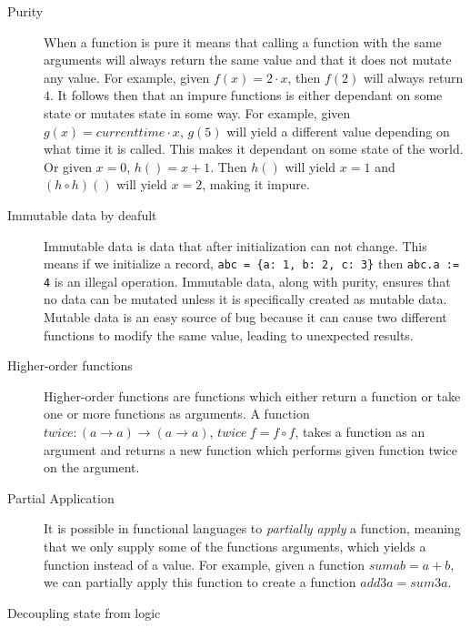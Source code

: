 \begin{description}
\item[ Purity ]

When a function is pure it means that calling a function with the same arguments
        will always return the same value and that it does not mutate any value.
        For example, given $f(x) = 2\cdot x$, then $f(2)$ will always
        return $4$. It follows then that an impure functions is either dependant
        on some state or mutates state in some way. For example, given $g(x) =
        currenttime \cdot x$, $g(5)$ will yield a different value depending on
        what time it is called. This makes it dependant on some state of the
        world. Or given $x=0$, $h()=x+1$. Then $h()$ will yield $x=1$ and $(h
        \circ h)()$ will yield $x=2$, making it impure.~\cite{wikipedia_pure}

\item[ Immutable data by deafult ]

Immutable data is data that after initialization can not change. This means if
we initialize a record, \texttt{abc = \{a: 1, b: 2, c: 3\}} then \texttt{abc.a
:= 4} is an illegal operation. Immutable data, along with purity, ensures that
no data can be mutated unless it is specifically created as mutable data.
Mutable data is an easy source of bug because it can cause two different
functions to modify the same value, leading to unexpected results.

\item[Higher-order functions]

	Higher-order functions are functions which either return a function or take
one or more functions as arguments. A function $twice : (a\rightarrow
a)\rightarrow (a\rightarrow a)$, $twice\ f = f \circ f$, takes a function as an
argument and returns a new function which performs given function twice on the
argument. 

\item[Partial Application] 
    It is possible in functional languages to \textit{partially apply} a
    function, meaning that we only supply some of the functions arguments, which
    yields a function instead of a value. For example, given a function $sum a b
    = a + b$, we can partially apply this function to create a function $add3 a
    = sum 3 a$. 

\item[Decoupling state from logic]


\end{description}
